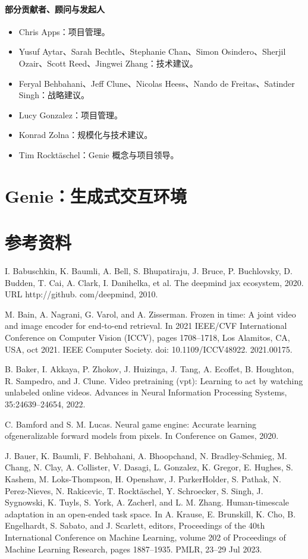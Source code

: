 \documentclass[10pt]{article}
\begin{document}
\paragraph{部分贡献者、顾问与发起人}
\begin{itemize}
  \item Chris Apps：项目管理。
  \item Yusuf Aytar、Sarah Bechtle、Stephanie Chan、Simon Osindero、Sherjil Ozair、Scott Reed、Jingwei Zhang：技术建议。
  \item Feryal Behbahani、Jeff Clune、Nicolas Heess、Nando de Freitas、Satinder Singh：战略建议。
  \item Lucy Gonzalez：项目管理。
  \item Konrad Zolna：规模化与技术建议。
  \item Tim Rocktäschel：Genie 概念与项目领导。
\end{itemize}

\section*{Genie：生成式交互环境}
\section*{参考资料}
I. Babuschkin, K. Baumli, A. Bell, S. Bhupatiraju, J. Bruce, P. Buchlovsky, D. Budden, T. Cai, A. Clark, I. Danihelka, et al. The deepmind jax ecosystem, 2020. URL http://github. com/deepmind, 2010.

M. Bain, A. Nagrani, G. Varol, and A. Zisserman. Frozen in time: A joint video and image encoder for end-to-end retrieval. In 2021 IEEE/CVF International Conference on Computer Vision (ICCV), pages 1708–1718, Los Alamitos, CA, USA, oct 2021. IEEE Computer Society. doi: 10.1109/ICCV48922. 2021.00175.

B. Baker, I. Akkaya, P. Zhokov, J. Huizinga, J. Tang, A. Ecoffet, B. Houghton, R. Sampedro, and J. Clune. Video pretraining (vpt): Learning to act by watching unlabeled online videos. Advances in Neural Information Processing Systems, 35:24639–24654, 2022.

C. Bamford and S. M. Lucas. Neural game engine: Accurate learning ofgeneralizable forward models from pixels. In Conference on Games, 2020.

J. Bauer, K. Baumli, F. Behbahani, A. Bhoopchand, N. Bradley-Schmieg, M. Chang, N. Clay, A. Collister, V. Dasagi, L. Gonzalez, K. Gregor, E. Hughes, S. Kashem, M. Loks-Thompson, H. Openshaw, J. ParkerHolder, S. Pathak, N. Perez-Nieves, N. Rakicevic, T. Rocktäschel, Y. Schroecker, S. Singh, J. Sygnowski, K. Tuyls, S. York, A. Zacherl, and L. M. Zhang. Human-timescale adaptation in an open-ended task space. In A. Krause, E. Brunskill, K. Cho, B. Engelhardt, S. Sabato, and J. Scarlett, editors, Proceedings of the 40th International Conference on Machine Learning, volume 202 of Proceedings of Machine Learning Research, pages 1887–1935. PMLR, 23–29 Jul 2023.
\end{document}
